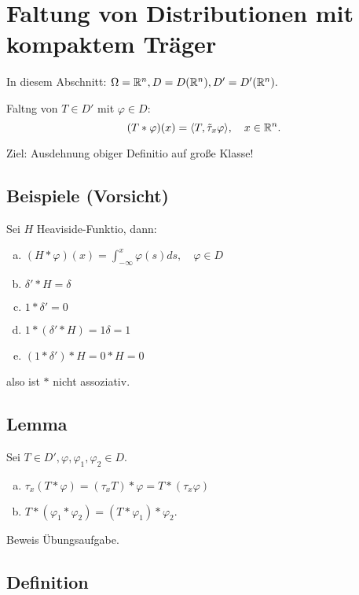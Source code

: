\section{Faltung von Distributionen mit kompaktem Träger}

In diesem Abschnitt: $\Omega = \mathbb{R}^n, D = D(\mathbb{R}^n), D' = D'(\mathbb{R}^n).$

Faltng von $T \in D'$ mit $\varphi \in D$: 
$$
(T \ast \varphi)(x) = \langle T, \tilde\tau_x \varphi \rangle, \quad x \in \mathbb{R}^n.
$$

Ziel: Ausdehnung obiger Definitio auf große Klasse!

\subsection{Beispiele (Vorsicht)}

Sei $H$ Heaviside-Funktio, dann:

\begin{enumerate}[a)]
  \item $(H \ast \varphi)(x) = \int_{-\infty}^x \varphi(s) ds, \quad \varphi \in D$
  \item $\delta' \ast H = \delta$
  \item $1 \ast \delta' = 0$
  \item $1 \ast (\delta' \ast H) = 1 \delta = 1$
  \item $(1 \ast \delta') \ast H = 0 \ast H = 0$
\end{enumerate}

also ist $\ast$ nicht assoziativ.

\subsection{Lemma}

Sei $T \in D', \varphi, \varphi_1, \varphi_2 \in D$.

\begin{enumerate}[a)]
  \item $\tau_x(T \ast \varphi) = (\tau_x T) \ast \varphi = T \ast (\tau_x \varphi)$
  \item $T \ast (\varphi_1 \ast \varphi_2) = (T \ast \varphi_1) \ast \varphi_2$.
\end{enumerate}

Beweis Übungsaufgabe.

\subsection{Definition}


